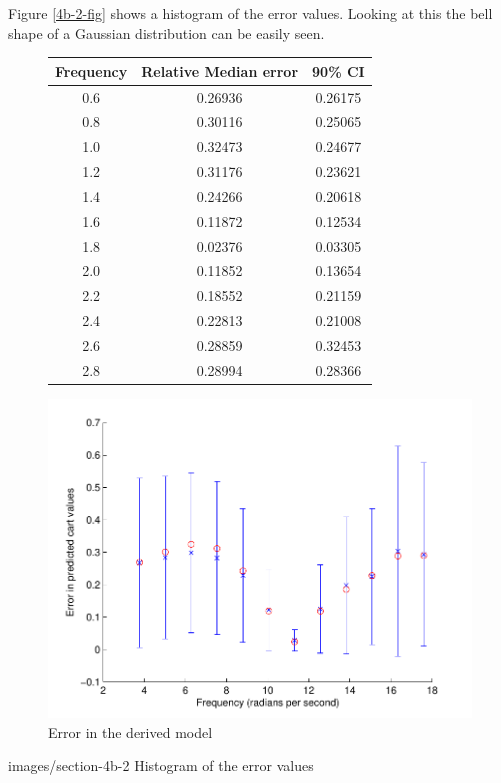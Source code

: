 Figure \ref{4b-2-fig} shows a histogram of the error values.  Looking at this
the bell shape of a Gaussian distribution can be easily seen.

\begin{figure}
  \centering
  \begin{minipage}{0.4\textwidth}
    \centering\scriptsize
    \begin{tabular}{c|c|c}
        Frequency & Relative Median error & 90\% CI \\
        \hline
        0.6 & 0.26936 & 0.26175 \\
        0.8 & 0.30116 & 0.25065 \\
        1.0 & 0.32473 & 0.24677 \\
        1.2 & 0.31176 & 0.23621 \\
        1.4 & 0.24266 & 0.20618 \\
        1.6 & 0.11872 & 0.12534 \\
        1.8 & 0.02376 & 0.03305 \\
        2.0 & 0.11852 & 0.13654 \\
        2.2 & 0.18552 & 0.21159 \\
        2.4 & 0.22813 & 0.21008 \\
        2.6 & 0.28859 & 0.32453 \\
        2.8 & 0.28994 & 0.28366 
    \end{tabular}
  \end{minipage}
  \hspace{0.1\textwidth}
  \begin{minipage}{0.4\textwidth}
    \centering
    \includegraphics[width=\textwidth]{images/section-4b}
  \end{minipage}
  \caption{Error in the derived model\label{4b}}
\end{figure}

              {images/section-4b-2}
              {Histogram of the error values\label{4b-2-fig}}
